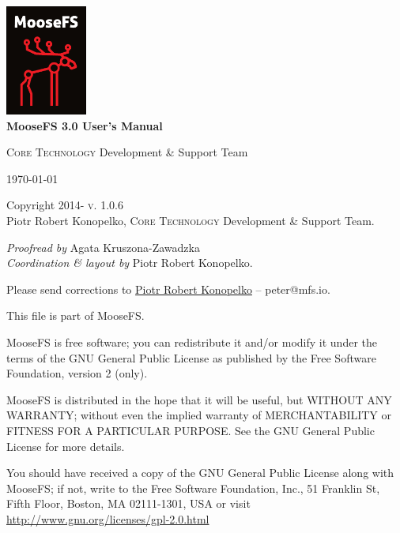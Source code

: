 \documentclass[a4paper,11pt,english]{report}
\newenvironment{copyrightnotice}
	{\begingroup
		\footnotesize
		\setlength{\parindent}{0pt}
		\setlength{\parskip}{\baselineskip}}
	{\endgroup}
\begin{document}
	
	\renewcommand{\labelitemi}{$\bullet$}
	\renewcommand{\labelitemii}{$\circ$}
	\renewcommand{\labelitemiii}{$\bullet$}
	\renewcommand{\labelitemiv}{$\circ$}
	
	\begin{titlepage}
		\begin{center}
			\includegraphics[width=0.2\textwidth]{images/moosefs.png}\\[1cm]
			
			{ \huge \bfseries MooseFS 3.0
			User's Manual \\[0.4cm] }
			

			\textsc{Core Technology} Development \& Support Team
			
			\vfill
			
			{\large \today}
		\end{center}
	\end{titlepage}
	
	
	\begin{copyrightnotice}
		\begin{flushleft}
			Copyright \textcopyright{} 2014-\the\year
			\hfill
			\textsc{v. 1.0.6}\\ %
			
			Piotr Robert Konopelko, \textsc{Core Technology} Development \& Support Team.
			
			\emph{Proofread by}
			Agata Kruszona-Zawadzka \\
			\emph{Coordination \& layout by} Piotr Robert Konopelko.
			
			Please send corrections to \href{mailto:peter@mfs.io}{Piotr Robert Konopelko} --  peter@mfs.io.
			
			\bigskip
			
			This file is part of MooseFS.
			
			MooseFS is free software; you can redistribute it and/or modify
			it under the terms of the GNU General Public License as published by
			the Free Software Foundation, version 2 (only).
			
			MooseFS is distributed in the hope that it will be useful,
			but WITHOUT ANY WARRANTY; without even the implied warranty of
			MERCHANTABILITY or FITNESS FOR A PARTICULAR PURPOSE. See the
			GNU General Public License for more details.
			
			You should have received a copy of the GNU General Public License
			along with MooseFS; if not, write to the Free Software
			Foundation, Inc., 51 Franklin St, Fifth Floor, Boston, MA 02111-1301, USA
			or visit \url{http://www.gnu.org/licenses/gpl-2.0.html}
		\end{flushleft}
	\end{copyrightnotice}
	
\end{document}
